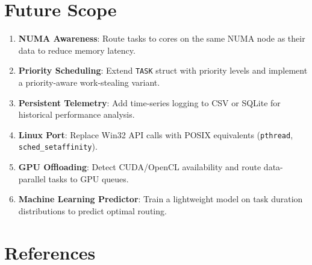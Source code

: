 \documentclass[12pt,a4paper]{article}
\begin{document}
\section{Future Scope}

\begin{enumerate}
  \item \textbf{NUMA Awareness}: Route tasks to cores on the same NUMA node as their data to reduce memory latency.
  \item \textbf{Priority Scheduling}: Extend \texttt{TASK} struct with priority levels and implement a priority-aware work-stealing variant.
  \item \textbf{Persistent Telemetry}: Add time-series logging to CSV or SQLite for historical performance analysis.
  \item \textbf{Linux Port}: Replace Win32 API calls with POSIX equivalents (\texttt{pthread}, \texttt{sched\_setaffinity}).
  \item \textbf{GPU Offloading}: Detect CUDA/OpenCL availability and route data-parallel tasks to GPU queues.
  \item \textbf{Machine Learning Predictor}: Train a lightweight model on task duration distributions to predict optimal routing.
\end{enumerate}

\newpage
\section*{References}
\end{document}
